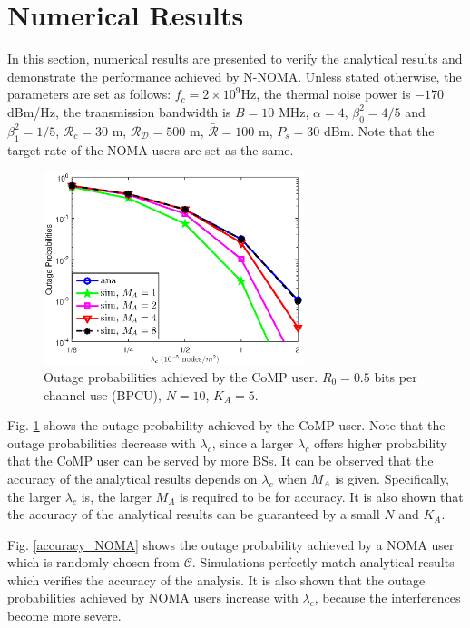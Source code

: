 \documentclass[10pt, doublecolumn]{IEEEtran}
\begin{document}
\section{Numerical Results}
In this section, numerical results are presented to verify the analytical results and demonstrate the performance achieved by N-NOMA.
Unless stated otherwise, the parameters are set as follows: $f_c=2\times 10^9$Hz, the thermal noise power is $-170$ dBm/Hz, the transmission bandwidth is $B=10$ MHz, $\alpha=4$, $\beta_0^2=4/5$ and $\beta_1^2=1/5$, $\mathcal{R}_c=30$ m, $\mathcal{R}_{\mathcal{D}}=500$ m, $\bar{\mathcal{R}}=100$ m, $P_s=30$ dBm. Note that the target rate of the NOMA users are set as the same.
\begin{figure}[!t]
\vspace{-1em}
\setlength{\abovecaptionskip}{0em}   %
\setlength{\belowcaptionskip}{-1em}   %
\centering
\includegraphics[width=3in]{accuracy_CoMP.eps}
\caption{Outage probabilities achieved by the CoMP user. $R_0=0.5$ bits per channel use (BPCU), $N=10$, $K_A=5$.}
\label{accuracy_CoMP}
\end{figure}

Fig. \ref{accuracy_CoMP} shows the outage probability achieved by the CoMP user. Note that the outage probabilities decrease with $\lambda_c$, since a larger $\lambda_c$ offers higher probability that the CoMP user can be served by more BSs. It can be observed that
the accuracy of the analytical results depends on $\lambda_c$ when $M_A$ is given. Specifically, the larger $\lambda_c$ is, the larger $M_A$ is required to be for accuracy. It is also shown that the accuracy of the analytical results can be guaranteed by a small $N$ and $K_A$.

Fig. \ref{accuracy_NOMA} shows the outage probability achieved by a NOMA user which is randomly chosen from $\mathcal{C}$. Simulations perfectly match analytical results which verifies the accuracy of the analysis. It is also shown that the outage probabilities achieved by NOMA users increase with $\lambda_c$, because the interferences become more severe.
\end{document}
